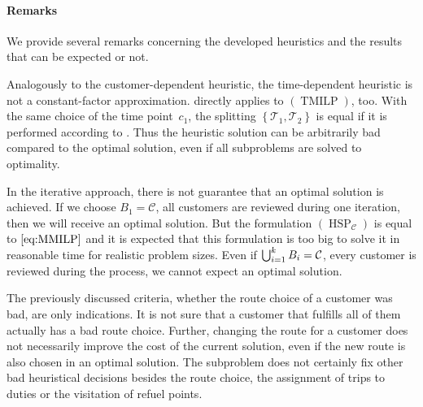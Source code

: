 \paragraph{Remarks} \parfill

We provide several remarks concerning the developed heuristics and the results that can be expected or not.

Analogously to the customer-dependent heuristic, the time-dependent heuristic is not a constant-factor approximation.  directly applies to $(\operatorname{TMILP})$, too. With the same choice of the time point~$c_1$, the splitting $\left\{\mathcal{T}_1,\mathcal{T}_2\right\}$ is equal if it is performed according to . Thus the heuristic solution can be arbitrarily bad compared to the optimal solution, even if all subproblems are solved to optimality.

In the iterative approach, there is not guarantee that an optimal solution is achieved. If we choose $B_1=\mathcal{C}$, \ie all customers are reviewed during one iteration, then we will receive an optimal solution. But the formulation $(\operatorname{HSP}_{\mathcal{C}})$ is equal to $\eqref{eq:MMILP}$ and it is expected that this formulation is too big to solve it in reasonable time for realistic problem sizes. Even if ${\bigcup_{i=1}^k B_i = \mathcal{C}}$, \ie every customer is reviewed during the process, we cannot expect an optimal solution.

The previously discussed criteria, whether the route choice of a customer was bad, are only indications. It is not sure that a customer that fulfills all of them actually has a bad route choice. Further, changing the route for a customer does not necessarily improve the cost of the current solution, even if the new route is also chosen in an optimal solution. The subproblem does not certainly fix other bad heuristical decisions besides the route choice, \eg the assignment of trips to duties or the visitation of refuel points.


